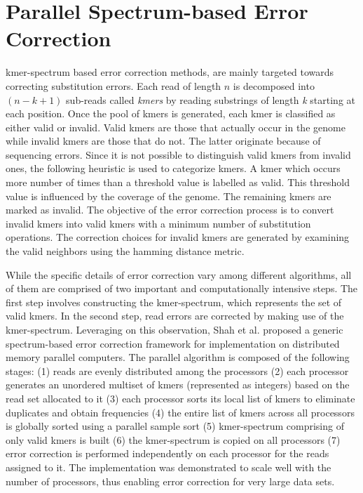 \documentclass[10pt, conference]{IEEEtran}
\begin{document}
\section{Parallel Spectrum-based Error Correction} \label{sec_Parallel}
kmer-spectrum based error correction methods, are mainly targeted towards correcting substitution errors. Each read of length $n$ is decomposed into $(n-k+1)$ sub-reads called {\it kmers} by reading substrings of length {\it k} starting at each position. Once the pool of kmers is generated, each kmer is classified as either valid or invalid. Valid kmers are those that actually occur in the genome while invalid kmers are those that do not. The latter originate because of sequencing errors. Since it is not possible to distinguish valid kmers from invalid ones, the following heuristic is used to categorize kmers. A kmer which occurs more number of times than a threshold value is labelled as valid. This threshold value is influenced by the coverage of the genome. The remaining kmers are marked as invalid. The objective of the error correction process is to convert invalid kmers into valid kmers with a minimum number of substitution operations. The correction choices for invalid kmers are generated by examining the valid neighbors using the hamming distance metric.

While the specific details of error correction vary among different algorithms, all of them are comprised of two important and computationally intensive steps. The first step involves constructing the kmer-spectrum, which represents the set of valid kmers. In the second step, read errors are corrected by making use of the kmer-spectrum. Leveraging on this observation, Shah et al. \cite{shah2012parallel} proposed a generic spectrum-based error correction framework for implementation on distributed memory parallel computers. The parallel algorithm is composed of the following stages: (1) reads are evenly distributed among the processors (2) each processor generates an unordered multiset of kmers (represented as integers) based on the read set allocated to it (3) each processor sorts its local list of kmers to eliminate duplicates and obtain frequencies (4) the entire list of kmers across all processors is globally sorted using a parallel sample sort (5) kmer-spectrum comprising of only valid kmers is built (6) the kmer-spectrum is copied on all processors (7) error correction is performed independently on each processor for the reads assigned to it. The implementation was demonstrated to scale well with the number of processors, thus enabling error correction for very large data sets.
\end{document}
